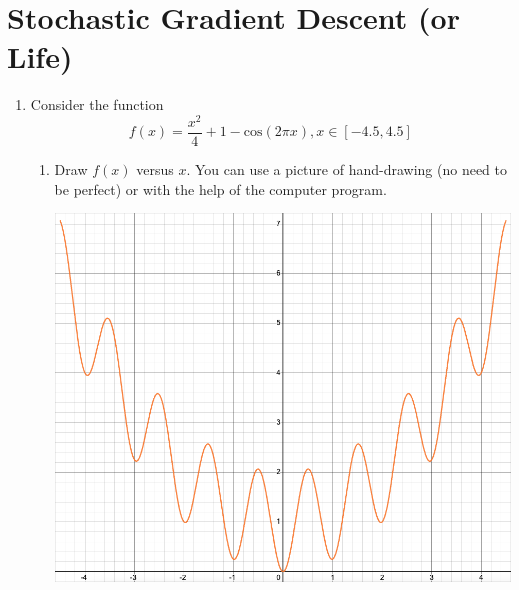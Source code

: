 \documentclass{assignment}
\begin{document}
\begin{problem}
\begin{enumerate}
\begin{enumerate}[label=(\alph*)]

    \end{enumerate}
\end{enumerate}


\section{Stochastic Gradient Descent (or Life)}

\begin{enumerate}

    \item Consider the function
    \begin{displaymath}
        f(x) = \frac{x^2}{4} + 1 - \text{cos}(2\pi x), x \in [-4.5, 4.5]
        \tag*{(1-3)}
    \end{displaymath}
    
    \begin{enumerate}[label=(\alph*)]

    
        \item Draw $f(x)$ versus $x$. You can use a picture of hand-drawing (no need to be perfect) or with the help of the computer program.

        \includegraphics[scale=.25]{474-2-1.png}


\end{enumerate}
\end{enumerate}
\end{problem}
\end{document}
